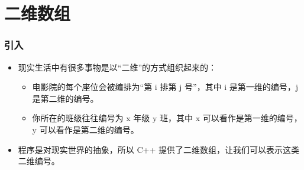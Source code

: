 \section{二维数组}

\begin{frame}[fragile]
    \frametitle{引入}

    \begin{itemize}[<+->]
        \item 现实生活中有很多事物是以“二维”的方式组织起来的：
        \begin{itemize}
            \item 电影院的每个座位会被编排为“第 i 排第 j 号”，其中 i 是第一维的编号，j 是第二维的编号。
            \item 你所在的班级往往编号为 x 年级 y 班，其中 x 可以看作是第一维的编号，y 可以看作是第二维的编号。
        \end{itemize}
        \item 程序是对现实世界的抽象，所以 C++ 提供了二维数组，让我们可以表示这类二维编号。
    \end{itemize}
\end{frame}

